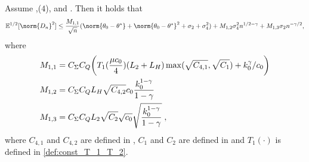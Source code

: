 \begin{lemma}
\label{lem:bound_Dn}
    Assume ,($4$),  and . Then it holds that 
    \begin{equation}
        \PE^{1/2}[\norm{D_n}^2]\leq \frac{M_{1,1}}{\sqrt{n}}(\norm{\theta_0-\thetas}+\norm{\theta_0-\thetas}^2+\sigma_2+ \sigma_4^2)+M_{1,2}\sigma_4^2n^{1/2-\gamma}+M_{1,3}\sigma_2n^{-\gamma/2},
    \end{equation}
    where 
    \begin{equation}
    \label{eq:def_const_M_1}
        \begin{split}         &M_{1,1}=C_{\Sigma}C_Q\biggl(T_1(\frac{\mu c_0}{4})(L_2+L_H)\max(\sqrt{C_{4,1}},\sqrt{C_1}) + k_0^\gamma/c_0\biggr)\\&M_{1,2}=C_{\Sigma}C_QL_H\sqrt{C_{4,2}}c_0\frac{k_0^{1-\gamma}}{1-\gamma}\\&M_{1,3}=C_{\Sigma}C_QL_2\sqrt{C_{2}}\sqrt{c_0}\sqrt{\frac{k_0^{1-\gamma}}{1-\gamma}}\;,
        \end{split}
    \end{equation}
where $C_{4,1}$ and $C_{4,2}$ are defined in , $C_1$ and $C_2$ are defined in  and $T_1(\cdot)$ is defined in \cref{def:const_T_1_T_2}.
\end{lemma}
